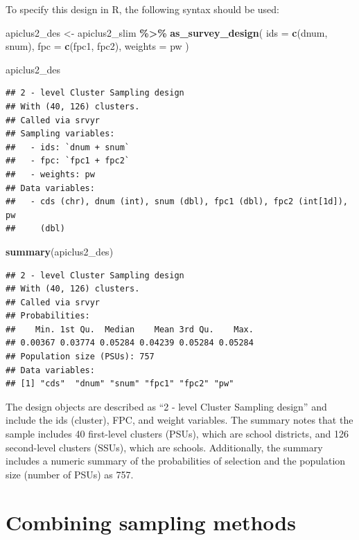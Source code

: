 \documentclass[
]{krantz}
\makeatletter
\newenvironment{Shaded}{\begin{snugshade}}{\end{snugshade}}
\newcommand{\AttributeTok}[1]{\textcolor[rgb]{0.27,0.27,0.27}{#1}}
\newcommand{\FunctionTok}[1]{\textcolor[rgb]{0.27,0.27,0.27}{\textbf{#1}}}
\newcommand{\NormalTok}[1]{#1}
\newcommand{\OtherTok}[1]{\textcolor[rgb]{0.37,0.37,0.37}{#1}}
\newcommand{\SpecialCharTok}[1]{\textcolor[rgb]{0.43,0.43,0.43}{\textbf{#1}}}
\newenvironment{kframe}{%
\medskip{}
\setlength{\fboxsep}{.8em}
 \def\at@end@of@kframe{}%
 \ifinner\ifhmode%
  \def\at@end@of@kframe{\end{minipage}}%
  \begin{minipage}{\columnwidth}%
 \fi\fi%
 \def\FrameCommand##1{\hskip\@totalleftmargin \hskip-\fboxsep
 \colorbox{shadecolor}{##1}\hskip-\fboxsep
     \hskip-\linewidth \hskip-\@totalleftmargin \hskip\columnwidth}%
 \MakeFramed {\advance\hsize-\width
   \@totalleftmargin\z@ \linewidth\hsize
   \@setminipage}}%
 {\par\unskip\endMakeFramed%
 \at@end@of@kframe}
\renewenvironment{Shaded}{\begin{kframe}}{\end{kframe}}
\makeatother
\begin{document}
To specify this design in R, the following syntax should be used:

\begin{Shaded}
\begin{Highlighting}[]
\NormalTok{apiclus2\_des }\OtherTok{\textless{}{-}}\NormalTok{ apiclus2\_slim }\SpecialCharTok{\%\textgreater{}\%}
  \FunctionTok{as\_survey\_design}\NormalTok{(}
    \AttributeTok{ids =} \FunctionTok{c}\NormalTok{(dnum, snum),}
    \AttributeTok{fpc =} \FunctionTok{c}\NormalTok{(fpc1, fpc2),}
    \AttributeTok{weights =}\NormalTok{ pw}
\NormalTok{  )}

\NormalTok{apiclus2\_des}
\end{Highlighting}
\end{Shaded}

\begin{verbatim}
## 2 - level Cluster Sampling design
## With (40, 126) clusters.
## Called via srvyr
## Sampling variables:
##   - ids: `dnum + snum` 
##   - fpc: `fpc1 + fpc2` 
##   - weights: pw 
## Data variables: 
##   - cds (chr), dnum (int), snum (dbl), fpc1 (dbl), fpc2 (int[1d]), pw
##     (dbl)
\end{verbatim}

\begin{Shaded}
\begin{Highlighting}[]
\FunctionTok{summary}\NormalTok{(apiclus2\_des)}
\end{Highlighting}
\end{Shaded}

\begin{verbatim}
## 2 - level Cluster Sampling design
## With (40, 126) clusters.
## Called via srvyr
## Probabilities:
##    Min. 1st Qu.  Median    Mean 3rd Qu.    Max. 
## 0.00367 0.03774 0.05284 0.04239 0.05284 0.05284 
## Population size (PSUs): 757 
## Data variables:
## [1] "cds"  "dnum" "snum" "fpc1" "fpc2" "pw"
\end{verbatim}

The design objects are described as ``2 - level Cluster Sampling design'' and include the ids (cluster), FPC, and weight variables. The summary notes that the sample includes 40 first-level clusters (PSUs), which are school districts, and 126 second-level clusters (SSUs), which are schools. Additionally, the summary includes a numeric summary of the probabilities of selection and the population size (number of PSUs) as 757.

\hypertarget{samp-combo}{%
\section{Combining sampling methods}\label{samp-combo}}
\end{document}
